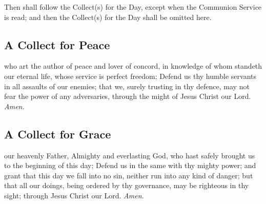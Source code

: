 
\clearpage
\begin{rubric}
Then shall follow the Collect(s) for the Day, except when the Communion Service is read; and then the Collect(s) for the Day shall be omitted here.
\end{rubric}

\subsection{A Collect for Peace}
 who art the author of peace and lover of concord, in knowledge of whom standeth our eternal life, whose service is perfect freedom; Defend us thy humble servants in all assaults of our enemies; that we, surely trusting in thy defence, may not fear the power of any adversaries, through the might of Jesus Christ our Lord. \textit{Amen.}

\subsection{A Collect for Grace}
 our heavenly Father, Almighty and everlasting God, who hast safely brought us to the beginning of this day; Defend us in the same with thy mighty power; and grant that this day we fall into no sin, neither run into any kind of danger; but that all our doings, being ordered by thy governance, may be righteous in thy sight; through Jesus Christ our Lord. \textit{Amen.}


